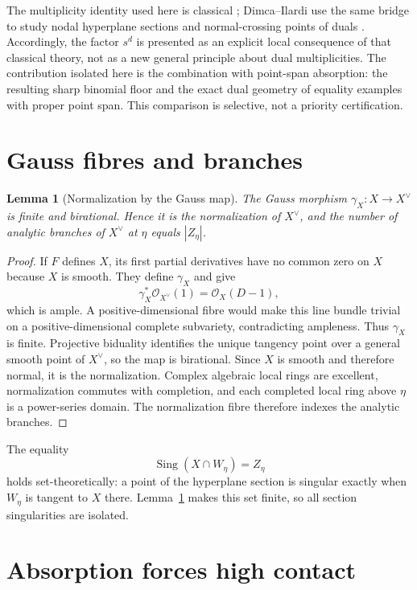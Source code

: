 \documentclass[11pt,a4paper]{article}
\newtheorem{lemma}[theorem]{Lemma}
\theoremstyle{definition}
\newcommand{\cO}{\mathcal O}
\newcommand{\Sing}{\operatorname{Sing}}
\begin{document}
The multiplicity identity used here is classical
\cite{Dimca1986,Parusinski1991}; Dimca--Ilardi use the same bridge to study
nodal hyperplane sections and normal-crossing points of duals
\cite{DimcaIlardi2024}.  Accordingly, the factor $s^d$ is presented as an
explicit local consequence of that classical theory, not as a new general
principle about dual multiplicities.  The contribution isolated here is the
combination with point-span absorption: the resulting sharp binomial floor
and the exact dual geometry of equality
examples with proper point span.  This comparison is selective, not a
priority certification.

\section{Gauss fibres and branches}

\begin{lemma}[Normalization by the Gauss map]\label{lem:normalization}
The Gauss morphism $\gamma_X:X\to X^\vee$ is finite and birational.  Hence it
is the normalization of $X^\vee$, and the number of analytic branches of
$X^\vee$ at $\eta$ equals $|Z_\eta|$.
\end{lemma}

\begin{proof}
If $F$ defines $X$, its first partial derivatives have no common zero on $X$
because $X$ is smooth.  They define $\gamma_X$ and give
\[
 \gamma_X^*\cO_{X^\vee}(1)=\cO_X(D-1),
\]
which is ample.  A positive-dimensional fibre would make this line bundle
trivial on a positive-dimensional complete subvariety, contradicting
ampleness.  Thus $\gamma_X$ is finite.  Projective biduality identifies the
unique tangency point over a general smooth point of $X^\vee$, so the map is
birational.  Since $X$ is smooth and therefore normal, it is the
normalization.  Complex algebraic local rings are excellent, normalization
commutes with completion, and each completed local ring above $\eta$ is a
power-series domain.  The normalization fibre therefore indexes the analytic
branches.
\end{proof}

The equality
\[
 \Sing(X\cap W_\eta)=Z_\eta
\]
holds set-theoretically: a point of the hyperplane section is singular exactly
when $W_\eta$ is tangent to $X$ there.  Lemma~\ref{lem:normalization} makes
this set finite, so all section singularities are isolated.

\section{Absorption forces high contact}
\end{document}
